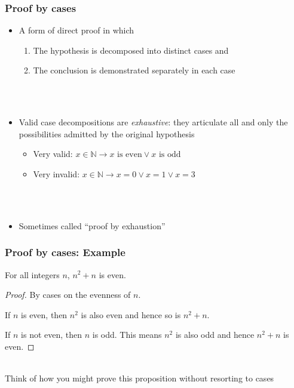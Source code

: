 \begin{frame}
  \frametitle{Proof by cases}
  \begin{itemize}
  \item A form of direct proof in which
    \begin{enumerate}
    \item The hypothesis is decomposed into distinct cases and
    \item The conclusion is demonstrated separately in each case
    \end{enumerate}
    \qquad\\\qquad\\
  \item Valid case decompositions are \textit{exhaustive}: they
    articulate all and only the possibilities admitted by the original
    hypothesis
    \begin{itemize}
    \item Very valid: $x\in\mathbb{N}\rightarrow x\text{ is even}\lor x\text{ is odd}$
    \item Very invalid: $x\in\mathbb{N}\rightarrow x=0\lor x=1\lor x=3$
    \end{itemize}
    \qquad\\\qquad\\
  \item Sometimes called ``proof by exhaustion''
  \end{itemize}
\end{frame}


\begin{frame}
  \frametitle{Proof by cases: Example}
  \begin{prop}
    For all integers $n$, $n^2+n$ is even.
  \end{prop}
  \begin{proof}
    By cases on the evenness of $n$.

    If $n$ is even, then $n^2$ is also even and hence so is $n^2 +n$.

    If $n$ is not even, then $n$ is odd.  This means $n^2$ is also odd
    and hence $n^2 +n$ is even.
  \end{proof}
  \qquad\\
   Think of how you might prove this proposition without
  resorting to cases
\end{frame}

